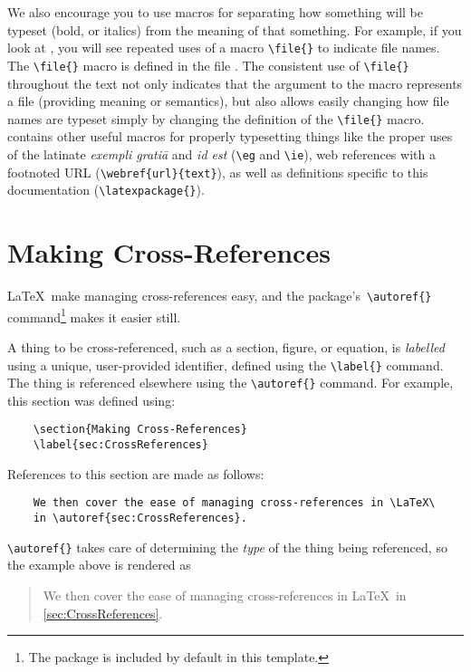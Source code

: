 We also encourage you to use macros for separating how something
will be typeset (\eg bold, or italics) from the meaning of that
something. 
For example, if you look at , you will see repeated
uses of a macro \verb+\file{}+ to indicate file names.
The \verb+\file{}+ macro is defined in the file .
The consistent use of \verb+\file{}+ throughout the text not only
indicates that the argument to the macro represents a file (providing
meaning or semantics), but also allows easily changing how
file names are typeset simply by changing the definition of the
\verb+\file{}+ macro.
 contains other useful macros for properly typesetting
things like the proper uses of the latinate \emph{exempli grati\={a}}
and \emph{id est} (\ie \verb+\eg+ and \verb+\ie+), 
web references with a footnoted \acs{URL} (\verb+\webref{url}{text}+),
as well as definitions specific to this documentation
(\verb+\latexpackage{}+).

\section{Making Cross-References}
\label{sec:CrossReferences}

\LaTeX\ make managing cross-references easy, and the 
package's\ \verb+\autoref{}+ command\footnote{%
    The  package is included by default in this
    template.}
makes it easier still. 

A thing to be cross-referenced, such as a section, figure, or equation,
is \emph{labelled} using a unique, user-provided identifier, defined
using the \verb+\label{}+ command.  
The thing is referenced elsewhere using the \verb+\autoref{}+ command.
For example, this section was defined using:
\begin{lstlisting}
    \section{Making Cross-References}
    \label{sec:CrossReferences}
\end{lstlisting}
References to this section are made as follows:
\begin{lstlisting}
    We then cover the ease of managing cross-references in \LaTeX\
    in \autoref{sec:CrossReferences}.
\end{lstlisting}
\verb+\autoref{}+ takes care of determining the \emph{type} of the 
thing being referenced, so the example above is rendered as
\begin{quote}
    We then cover the ease of managing cross-references in \LaTeX\
    in \autoref{sec:CrossReferences}.
\end{quote}

